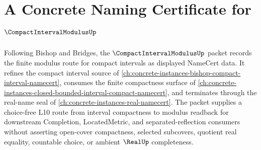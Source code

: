 \chapter{A Concrete Naming Certificate for $\CompactIntervalModulusUp$}
\label{ch:concrete-instances-compact-interval-modulus-namecert}

Following Bishop and Bridges, the $\CompactIntervalModulusUp$ packet records the finite modulus route for compact intervals as displayed NameCert data. It refines the compact interval source of \autoref{ch:concrete-instances-bishop-compact-interval-namecert}, consumes the finite compactness surface of \autoref{ch:concrete-instances-closed-bounded-interval-compact-namecert}, and terminates through the real-name seal of \autoref{ch:concrete-instances-real-namecert}. The packet supplies a choice-free L10 route from interval compactness to modulus readback for downstream Completion, LocatedMetric, and separated-reflection consumers without asserting open-cover compactness, selected subcovers, quotient real equality, countable choice, or ambient $\RealUp$ completeness.

